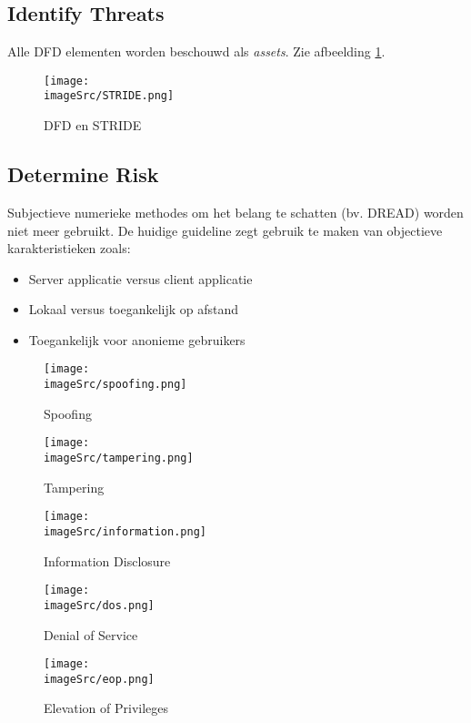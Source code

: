 \documentclass[../main.tex]{subfiles}
\begin{document}
\subsection{Identify Threats}
Alle DFD elementen worden beschouwd als \textit{assets}. Zie afbeelding \ref{f:STRIDE}.
\begin{figure}[H]
    \centering
    \texttt{[image: \\imageSrc/STRIDE.png]}
    \caption{DFD en STRIDE}
    \label{f:STRIDE}
\end{figure}
\subsection{Determine Risk}
Subjectieve numerieke methodes om het belang te schatten (bv. DREAD) worden niet meer gebruikt. De huidige guideline zegt gebruik te maken van objectieve karakteristieken zoals:
\begin{itemize}
	\item Server applicatie versus client applicatie
	\item Lokaal versus toegankelijk op afstand
	\item Toegankelijk voor anonieme gebruikers
\end{itemize}

\begin{figure}[H]
    \centering
    \texttt{[image: \\imageSrc/spoofing.png]}
    \caption{Spoofing}
    \label{spoofing}
\end{figure}

\begin{figure}[H]
    \centering
    \texttt{[image: \\imageSrc/tampering.png]}
    \caption{Tampering}
    \label{tampering}
\end{figure}

\begin{figure}[H]
    \centering
    \texttt{[image: \\imageSrc/information.png]}
    \caption{Information Disclosure}
    \label{information}
\end{figure}

\begin{figure}[H]
    \centering
    \texttt{[image: \\imageSrc/dos.png]}
    \caption{Denial of Service}
    \label{dos}
\end{figure}

\begin{figure}[H]
    \centering
    \texttt{[image: \\imageSrc/eop.png]}
    \caption{Elevation of Privileges}
    \label{eop}
\end{figure}
\end{document}
